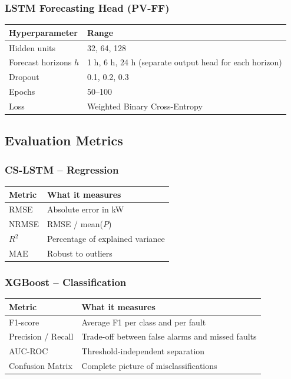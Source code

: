 \documentclass[11pt,a4paper]{article}
\begin{document}
\subsubsection*{LSTM Forecasting Head (PV-FF)}
\begin{tabularx}{\textwidth}{@{}p{}Y@{}}
\hline
\textbf{Hyperparameter} & \textbf{Range} \\
\hline
Hidden units & 32, 64, 128 \\
Forecast horizons $h$ & 1 h, 6 h, 24 h (separate output head for each horizon) \\
Dropout & 0.1, 0.2, 0.3 \\
Epochs & 50--100 \\
Loss & Weighted Binary Cross-Entropy \\
\hline
\end{tabularx}

\subsection*{Evaluation Metrics}

\subsubsection*{CS-LSTM -- Regression}
\begin{tabularx}{\textwidth}{@{}p{}Y@{}}
\hline
\textbf{Metric} & \textbf{What it measures} \\
\hline
RMSE & Absolute error in kW \\
NRMSE & RMSE / mean($P$) \\
$R^2$ & Percentage of explained variance \\
MAE & Robust to outliers \\
\hline
\end{tabularx}

\subsubsection*{XGBoost -- Classification}
\begin{tabularx}{\textwidth}{@{}p{}Y@{}}
\hline
\textbf{Metric} & \textbf{What it measures} \\
\hline
F1-score & Average F1 per class and per fault \\
Precision / Recall & Trade-off between false alarms and missed faults \\
AUC-ROC & Threshold-independent separation \\
Confusion Matrix & Complete picture of misclassifications \\
\hline
\end{tabularx}
\end{document}
